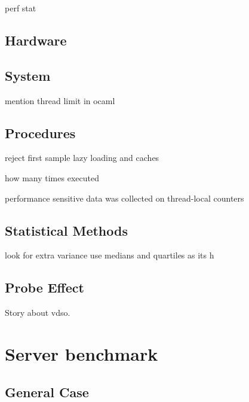 \documentclass[12pt,a4paper,twoside]{report}
\begin{document}
perf stat

\subsection{Hardware}

\subsection{System}
\label{section:methods_system}
mention thread limit in ocaml
\subsection{Procedures}
reject first sample lazy loading and caches

how many times executed

performance sensitive data was collected on thread-local counters
\subsection{Statistical Methods}

look for extra variance
use medians and quartiles as its h
\subsection{Probe Effect}

Story about vdso.







\section{Server benchmark} 

\subsection{General Case}
\label{section:benchmark-general-case}
\end{document}
